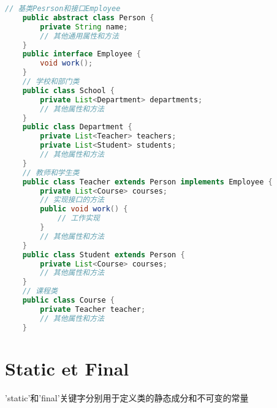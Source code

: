 \documentclass{article}
\begin{document}
\begin{tcolorbox}
    \begin{lstlisting}[language=java]
    // 基类Pesrson和接口Employee
    public abstract class Person {
        private String name;
        // 其他通用属性和方法
    }
    public interface Employee {
        void work();
    }
    // 学校和部门类
    public class School {
        private List<Department> departments;
        // 其他属性和方法
    }
    public class Department {
        private List<Teacher> teachers;
        private List<Student> students;
        // 其他属性和方法
    }
    // 教师和学生类
    public class Teacher extends Person implements Employee {
        private List<Course> courses;
        // 实现接口的方法
        public void work() {
            // 工作实现
        }
        // 其他属性和方法
    }
    public class Student extends Person {
        private List<Course> courses;
        // 其他属性和方法
    }
    // 课程类
    public class Course {
        private Teacher teacher;
        // 其他属性和方法
    }
    \end{lstlisting}
\end{tcolorbox}
\section{ Static et Final}
'static'和'final'关键字分别用于定义类的静态成分和不可变的常量
\end{document}
